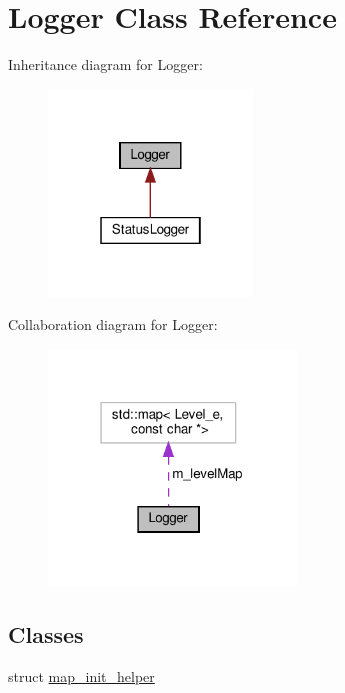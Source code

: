 \hypertarget{classLogger}{}\section{Logger Class Reference}
\label{classLogger}


Inheritance diagram for Logger\+:\nopagebreak
\begin{figure}[H]
\begin{center}
\leavevmode
\includegraphics[width=154pt]{classLogger__inherit__graph}
\end{center}
\end{figure}


Collaboration diagram for Logger\+:\nopagebreak
\begin{figure}[H]
\begin{center}
\leavevmode
\includegraphics[width=187pt]{classLogger__coll__graph}
\end{center}
\end{figure}
\subsection*{Classes}
\begin{DoxyCompactItemize}
\item 
struct \hyperlink{structLogger_1_1map__init__helper}{map\+\_\+init\+\_\+helper}
\end{DoxyCompactItemize}
